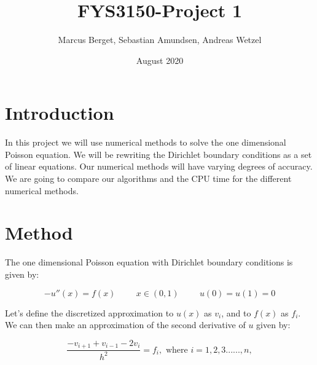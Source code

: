 \documentclass[norsk,a4paper,12pt]{article}
\title{FYS3150-Project 1}
\author{Marcus Berget, Sebastian Amundsen, Andreas Wetzel}
\date{August 2020}
\begin{document}
\maketitle

\begin{abstract}

\end{abstract}

\section{Introduction}

In this project we will use numerical methods to solve the one dimensional Poisson equation. We will be rewriting the Dirichlet boundary conditions as a set of linear equations. Our numerical methods will have varying degrees of accuracy. We are going to compare our algorithms and the CPU time for the different numerical methods. 

\section{Method}

The one dimensional Poisson equation with Dirichlet boundary conditions is given by:

\begin{equation}
-u''(x)=f(x) \hspace{1cm} x \in (0,1) \hspace{1cm} u(0)=u(1)=0
 \label{eq:udd}
 \end{equation}

Let's define the discretized approximation to $u(x)$ as $v_i$, and to $f(x)$ as $f_i$. We can then make an approximation of the second derivative of $u$ given by:

\begin{equation}
\frac{-v_{i+1}+v_{i-1}-2v_i}{h^2}=f_i, \textrm{  where  } i=1,2,3......,n,
 \label{eq:2der}
 \end{equation}
 
\end{document}
